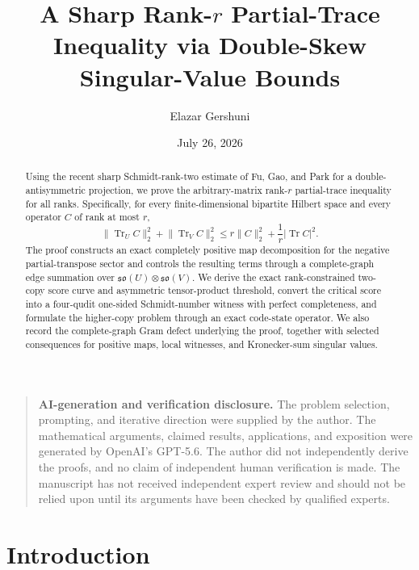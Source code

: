 \documentclass[11pt,reqno]{amsart}
\title[A Sharp Rank-$r$ Partial-Trace Inequality]
{A Sharp Rank-$r$ Partial-Trace Inequality via Double-Skew Singular-Value Bounds}
\author{Elazar Gershuni}
\date{July 26, 2026}
\theoremstyle{remark}
\DeclareMathOperator{\Tr}{Tr}
\newcommand{\norm}[1]{\lVert #1\rVert}
\newcommand{\abs}[1]{\lvert #1\rvert}
\begin{document}
\begin{abstract}
Using the recent sharp Schmidt-rank-two estimate of Fu, Gao,
and Park for a double-antisymmetric projection, we prove the
arbitrary-matrix rank-$r$ partial-trace inequality for all ranks. Specifically, for every finite-dimensional bipartite Hilbert
space and every operator $C$ of rank at most $r$,
\[
    \norm{\Tr_U C}_2^2+\norm{\Tr_V C}_2^2
    \le r\norm{C}_2^2+\frac{1}{r}\abs{\Tr C}^2.
\]
The proof constructs an exact completely positive map decomposition for
the negative partial-transpose sector and controls the resulting terms
through a complete-graph edge summation over
$\mathfrak{so}(U)\otimes\mathfrak{so}(V)$. We derive the exact
rank-constrained two-copy score curve and asymmetric tensor-product
threshold, convert the critical score into a four-qudit one-sided
Schmidt-number witness with perfect completeness, and formulate the
higher-copy problem through an exact code-state operator. We also
record the complete-graph Gram defect underlying the proof, together
with selected consequences for positive maps, local witnesses, and
Kronecker-sum singular values.
\end{abstract}

\maketitle

\begin{quote}\small
\textbf{AI-generation and verification disclosure.}
The problem selection, prompting, and iterative direction were supplied
by the author. The mathematical arguments, claimed results,
applications, and exposition were generated by OpenAI's GPT-5.6.
The author did not independently derive the proofs, and no claim of
independent human verification is made. The manuscript has not received independent expert review and should not
be relied upon until its arguments have been checked by qualified experts.
\end{quote}

\section{Introduction}
\end{document}
